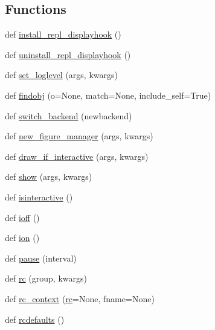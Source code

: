 \subsection*{Functions}
\begin{DoxyCompactItemize}
\item 
def \hyperlink{namespacematplotlib_1_1pyplot_a64e5c8db0d4e8dc318605ceb2318c58a}{install\+\_\+repl\+\_\+displayhook} ()
\item 
def \hyperlink{namespacematplotlib_1_1pyplot_aaa524ea07152a2ee7eaa40a858604006}{uninstall\+\_\+repl\+\_\+displayhook} ()
\item 
def \hyperlink{namespacematplotlib_1_1pyplot_a72c34025eed7bcda9c38580421e609c0}{set\+\_\+loglevel} (args, kwargs)
\item 
def \hyperlink{namespacematplotlib_1_1pyplot_aa293ea1ea63d4b71163ca6160e3b078d}{findobj} (o=None, match=None, include\+\_\+self=True)
\item 
def \hyperlink{namespacematplotlib_1_1pyplot_a17625f79e32a9debfb67119529af0479}{switch\+\_\+backend} (newbackend)
\item 
def \hyperlink{namespacematplotlib_1_1pyplot_a76093e31f65fe614111ac87b64b01497}{new\+\_\+figure\+\_\+manager} (args, kwargs)
\item 
def \hyperlink{namespacematplotlib_1_1pyplot_ad2e69f00916e6d7884462c0ea4c8c087}{draw\+\_\+if\+\_\+interactive} (args, kwargs)
\item 
def \hyperlink{namespacematplotlib_1_1pyplot_a8fc9734aaaf07cb42642b5552c04a3e7}{show} (args, kwargs)
\item 
def \hyperlink{namespacematplotlib_1_1pyplot_ae7d45bb4117c9cd8b5a80b5a56178fd7}{isinteractive} ()
\item 
def \hyperlink{namespacematplotlib_1_1pyplot_afe399bc78857cdcc346b70651fae94b7}{ioff} ()
\item 
def \hyperlink{namespacematplotlib_1_1pyplot_ac6b08ebe91174772ff5b33ea38b66ebd}{ion} ()
\item 
def \hyperlink{namespacematplotlib_1_1pyplot_ab75eb177cd56bbe05c86b7953ac4f694}{pause} (interval)
\item 
def \hyperlink{namespacematplotlib_1_1pyplot_a7ee9fd80789c6152a6bdb33f22c67d11}{rc} (group, kwargs)
\item 
def \hyperlink{namespacematplotlib_1_1pyplot_a919ec0aa27089a66fcc8556bebf8fe1f}{rc\+\_\+context} (\hyperlink{namespacematplotlib_1_1pyplot_a7ee9fd80789c6152a6bdb33f22c67d11}{rc}=None, fname=None)
\item 
def \hyperlink{namespacematplotlib_1_1pyplot_ada85c482c5a2eacaad031407d2f060d4}{rcdefaults} ()

\end{DoxyCompactItemize}
